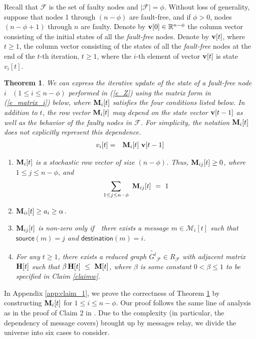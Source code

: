\documentclass[letterpaper, 11pt]{article}
\newtheorem{theorem}{Theorem}[section]
\newcommand{\calF}{{\mathcal{F}}}
\newcommand{\calM}{{\mathcal{M}}}
\begin{document}
Recall that $\calF$ is the set of faulty nodes and $|\calF|=\phi$.
Without loss of generality, suppose that nodes 1 through $(n-\phi)$ are
fault-free, and if $\phi>0$, nodes $(n-\phi+1)$ through $n$ are faulty.
Denote by ${\bf{v}}[0]\in \mathbb{R}^{n-\phi}$ the column vector consisting of the initial states of
all the {\em fault-free} nodes.
Denote by ${\bf{v}}[t]$, where $t\geq 1$, the column vector consisting of
the states of all the {\em fault-free} nodes
at the end of the $t$-th iteration, $t\geq 1$, where the $i$-th element
of vector ${\bf{v}}[t]$ is state $v_i[t]$. \begin{theorem}
\label{claim_1}
{
We can express the iterative update of the state
of a fault-free node $i$ $~~(1\leq i\leq n-\phi)$
performed in (\ref{e_Z}) using the matrix form in (\ref{e_matrix_i})
below,
where ${\bf{M}}_i[t]$ satisfies the four conditions listed below.
In addition to $t$, the row vector ${\bf{M}}_i[t]$
may depend on the state vector ${\bf{v}}[t-1]$ as well as the
behavior of the faulty
nodes in $\calF$. For simplicity, the notation ${\bf{M}}_i[t]$ does not
explicitly represent this dependence.
\begin{eqnarray}
v_i[t] & = & {\bf{M}}_i[t] ~ {{\bf{v}}}[t-1]
\label{e_matrix_i}
\end{eqnarray}
}
\begin{enumerate}
\item ${\bf{M}}_i[t]$ is a {\em stochastic} row vector of size $(n-\phi)$.
Thus,
${\bf{M}}_{ij}[t]\geq 0$, where $1\leq j\leq n-\phi$, and
\[
\sum_{1\leq j\leq n-\phi}~{\bf{M}}_{ij}[t] ~ = ~ 1
\]

\item ${\bf{M}}_{ii}[t]\ge a_i\ge \alpha$.

\item ${\bf{M}}_{ij}[t]$ is non-zero
only if~~there exists a message $m\in \calM_i[t]$ such that $\mathsf{source}(m)=j$ and $\mathsf{destination}(m)=i$.
\item For any $t\geq 1$, there exists a reduced graph $\widetilde{G^l}_{\calF}\in R_\calF$ with adjacent matrix ${\bf{H}}[t]$ such that
$\beta \, {\bf{H}}[t] ~ \leq ~  {{\bf{M}}[t]}$, where $
\beta$ is some constant $0<\beta\le 1$ to be specified in Claim \ref{claimw}.


\end{enumerate}
\end{theorem}
In Appendix \ref{app:claim_1}, we prove the correctness of Theorem \ref{claim_1} by constructing ${\bf{M}}_i[t]$
for $1\leq i\leq n-\phi$. Our proof follows the same line of analysis as in the proof of Claim 2 in \cite{Vaidyamatrix}. Due to the complexity (in particular, the dependency of message covers) brought up by messages relay, we divide the universe into six cases to consider.
\end{document}
